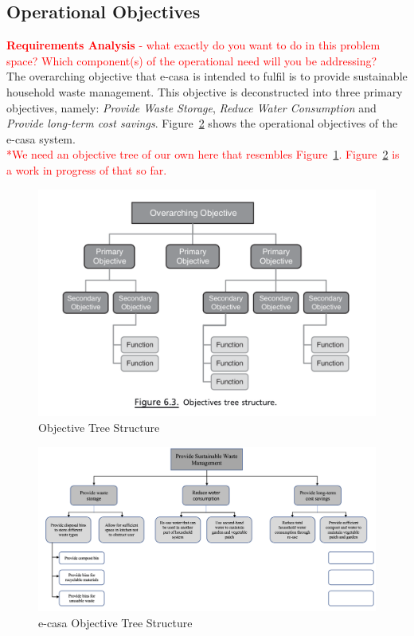 \documentclass[a4paper,11pt,fleqn]{report}
\begin{document}
\subsection{Operational Objectives}
\textcolor{red}{\textbf{Requirements Analysis} - what exactly do you want to do in this problem space? Which component(s) of the operational need will you be addressing?}\\

The overarching objective that \ac{e-casa} is intended to fulfil is to provide sustainable household waste management. This objective is deconstructed into three primary objectives, namely: \textit{Provide Waste Storage}, \textit{Reduce Water Consumption} and \textit{Provide long-term cost savings}. Figure~\ref{fig: ecasaOT} shows the operational objectives of the \ac{e-casa} system.\\

\textcolor{red}{*We need an objective tree of our own here that resembles Figure~\ref{fig: ObjectiveTreeStructure}. Figure~\ref{fig: ecasaOT} is a work in progress of that so far.}

\begin{figure}[h!]
\begin{center}
\includegraphics[scale = 0.6]{Objective_Tree_Structure.png}
\caption{Objective Tree Structure}
\label{fig: ObjectiveTreeStructure}
\end{center}
\end{figure}

\begin{figure}[h!]
\begin{center}
\includegraphics[scale = 0.34]{ecasa_OT.png}
\caption{e-casa Objective Tree Structure}
\label{fig: ecasaOT}
\end{center}
\end{figure}
\end{document}
